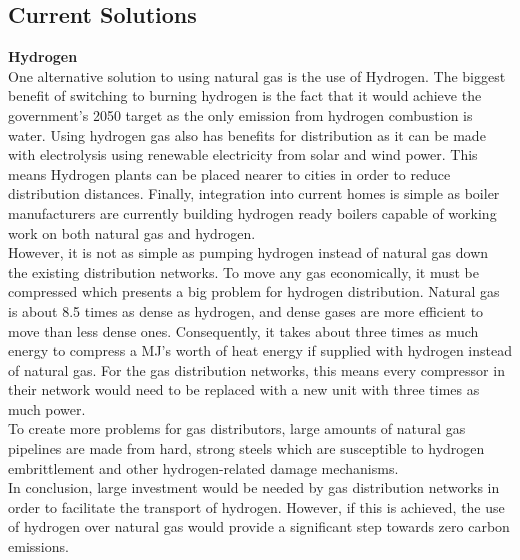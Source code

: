 \documentclass[11pt]{article}		%
\begin{document}
            \subsection[Current Solutions]{Current Solutions}
            \textbf{Hydrogen} \\
            One alternative solution to using natural gas is the use of Hydrogen. The biggest benefit of switching to burning hydrogen is the fact that it would achieve the government's 2050 target as the only emission from hydrogen combustion is water. Using hydrogen gas also has benefits for distribution as it can be made with electrolysis using renewable electricity from solar and wind power. This means Hydrogen plants can be placed nearer to cities in order to reduce distribution distances. Finally, integration into current homes is simple as boiler manufacturers are currently building hydrogen ready boilers capable of working work on both natural gas and hydrogen.\\
            \hspace*{3ex}However, it is not as simple as pumping hydrogen instead of natural gas down the existing distribution networks. To move any gas economically, it must be compressed which presents a big problem for hydrogen distribution. Natural gas is about 8.5 times as dense as hydrogen, and dense gases are more efficient to move than less dense ones. Consequently, it takes about three times as much energy to compress a MJ’s worth of heat energy if supplied with hydrogen instead of natural gas. For the gas distribution networks, this means every compressor in their network would need to be replaced with a new unit with three times as much power.\\
            \hspace*{3ex}To create more problems for gas distributors, large amounts of natural gas pipelines are made from hard, strong steels which are susceptible to hydrogen embrittlement and other hydrogen-related damage mechanisms.\\
            \hspace*{3ex}In conclusion, large investment would be needed by gas distribution networks in order to facilitate the transport of hydrogen. However, if this is achieved, the use of hydrogen over natural gas would provide a significant step towards zero carbon emissions.\\ 
            
\end{document}
